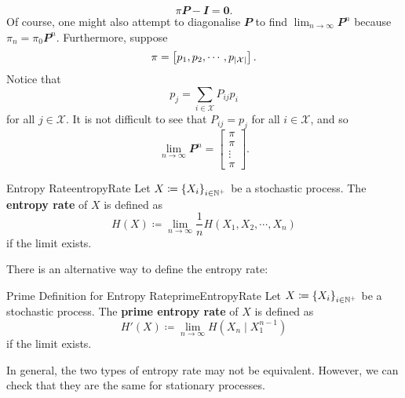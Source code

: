 \documentclass[math, code]{amznotes}
\theoremstyle{remark}
\begin{document}
\begin{equation*}
    \pi\mathbfit{P - I} = \mathbf{0}.
\end{equation*}
Of course, one might also attempt to diagonalise $\mathbfit{P}$ to find $\lim_{n \to \infty}\mathbfit{P}^n$ because $\pi_n = \pi_0\mathbfit{P}^n$. Furthermore, suppose 
\begin{equation*}
    \pi = \begin{bmatrix}
        p_1, p_2, \cdots, p_{{\left\lvert {\mathcal{X}} \right\rvert}}
    \end{bmatrix}.
\end{equation*}
Notice that
\begin{equation*}
    p_j = \sum_{i \in \mathcal{X}}P_{ij}p_i
\end{equation*}
for all $j \in \mathcal{X}$. It is not difficult to see that $P_{ij} = p_j$ for all $i \in \mathcal{X}$, and so 
\begin{equation*}
    \lim_{n \to \infty}\mathbfit{P}^n = \begin{bmatrix}
        \pi \\
        \pi \\
        \vdots \\
        \pi
    \end{bmatrix}.
\end{equation*}
\begin{dfnbox}{Entropy Rate}{entropyRate}
    Let $X \coloneqq \left\{X_i\right\}_{i \in \mathbb{N}^+}$ be a stochastic process. The {\color{red} \textbf{entropy rate}} of $X$ is defined as 
    \begin{equation*}
        H\left(X\right) \coloneqq \lim_{n \to \infty}\frac{1}{n}H\left(X_1, X_2, \cdots, X_n\right)
    \end{equation*}
    if the limit exists.
\end{dfnbox}
There is an alternative way to define the entropy rate:
\begin{dfnbox}{Prime Definition for Entropy Rate}{primeEntropyRate}
    Let $X \coloneqq \left\{X_i\right\}_{i \in \mathbb{N}^+}$ be a stochastic process. The {\color{red} \textbf{prime entropy rate}} of $X$ is defined as 
    \begin{equation*}
        H'\left(X\right) \coloneqq \lim_{n \to \infty}H\left(X_{n} \mid X_1^{n - 1}\right)
    \end{equation*}
    if the limit exists.
\end{dfnbox}
In general, the two types of entropy rate may not be equivalent. However, we can check that they are the same for stationary processes.
\end{document}
